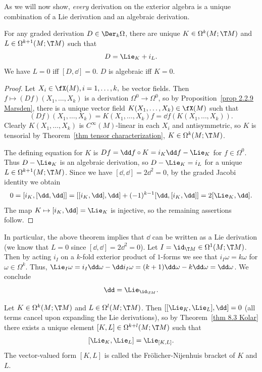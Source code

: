 As we will now show, \emph{every} derivation on the exterior algebra is a unique combination of a Lie derivation and an algebraic derivation.

\begin{thm}\label{thm 8.3 Kolar}
    For any graded derivation $D\in\Der_k\Omega$, there are unique $K\in\Omega^k(M;\T M)$ and $L\in\Omega^{k+1}(M;\T M)$ such that 
    \[D=\Lie_K+i_L.\]
    We have $L=0$ iff $[D,\dd]=0$. $D$ is algebraic iff $K=0$.
\end{thm}
\begin{proof}
    Let $X_i\in\fX(M),i=1,\ldots,k,$ be vector fields. Then $f\mapsto (Df)(X_1,\ldots,X_k)$ is a derivation $\Omega^0\to \Omega^0$, so by Proposition~\ref{prop 2.2.9 Marsden}, there is a unique vector field $K(X_1,\ldots,X_k)\in\fX(M)$ such that 
    \[(Df)(X_1,\ldots,X_k)=K(X_1,\ldots,X_k)f=\dd f(K(X_1,\ldots,X_k)).\]
    Clearly $K(X_1,\ldots,X_k)$ is $C^\infty(M)$-linear in each $X_i$ and antisymmetric, so $K$ is tensorial by Theorem~\ref{thm tensor characterization}, $K\in\Omega^k(M;\T M)$.

    The defining equation for $K$ is $Df=\dd f\circ K=i_K\dd f-\Lie_K$ for $f\in\Omega^0$. Thus $D-\Lie_K$ is an algebraic derivation, so $D-\Lie_K=i_L$ for a unique $L\in\Omega^{k+1}(M;\T M)$. Since we have $[\dd,\dd]=2\dd^2=0$, by the graded Jacobi identity we obtain
    \[0=[i_K,[\dd,\dd]]=[[i_K,\dd],\dd]+(-1)^{k-1}[\dd,[i_K,\dd]]=2[\Lie_K,\dd].\]
    The map $K\mapsto [i_K,\dd]=\Lie_K$ is injective, so the remaining assertions follow.
\end{proof}


\begin{rem}
    In particular, the above theorem implies that $\dd$ can be written as a Lie derivation (we know that $L=0$ since $[\dd,\dd]=2\dd^2=0$). Let $I=\id_{\T M}\in\Omega^1(M;\T M)$. Then by acting $i_I$ on a $k$-fold exterior product of $1$-forms we see that $i_I \omega=k\omega$ for $\omega\in\Omega^k$. Thus, $\Lie_{I}\omega=i_I\dd\omega-\dd i_I\omega=(k+1)\dd\omega-k\dd\omega=\dd\omega$. We conclude
    \[\dd=\Lie_{\id_{\T M}}.\]
\end{rem}

\begin{defn}
    Let $K\in\Omega^k(M;\T M)$ and $L\in\Omega^l(M;\T M)$. Then $[[\Lie_K,\Lie_L],\dd]=0$ (all terms cancel upon expanding the Lie derivations), so by Theorem~\ref{thm 8.3 Kolar} there exists a unique element $[K,L]\in \Omega^{k+l}(M;\T M)$ such that 
    \[[\Lie_K,\Lie_L]=\Lie_{[K,L]}.\]
    The vector-valued form $[K,L]$ is called the Fr\"olicher-Nijenhuis bracket of $K$ and $L$.
\end{defn}


